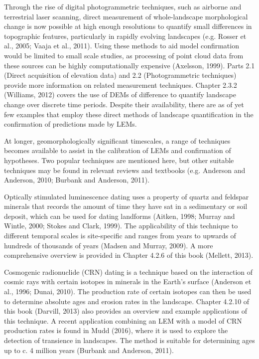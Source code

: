 Through the rise of digital photogrammetric techniques, such as airborne and terrestrial laser scanning, direct measurement of whole-landscape morphological change is now possible at high enough resolutions to quantify small differences in topographic features, particularly in rapidly evolving landscapes (e.g. Rosser et al., 2005; Vaaja et al., 2011). Using these methods to aid model confirmation would be limited to small scale studies, as processing of point cloud data from these sources can be highly computationally expensive (Axelsson, 1999). Parts 2.1 (Direct acquisition of elevation data) and 2.2 (Photogrammetric techniques) provide more information on related measurement techniques. Chapter 2.3.2 (Williams, 2012) covers the use of DEMs of difference to quantify landscape change over discrete time periods. Despite their availability, there are as of yet few examples that employ these direct methods of landscape quantification in the confirmation of predictions made by LEMs.

At longer, geomorphologically significant timescales, a range of techniques becomes available to assist in the calibration of LEMs and confirmation of hypotheses. Two popular techniques are mentioned here, but other suitable techniques may be found in relevant reviews and textbooks (e.g. Anderson and Anderson, 2010; Burbank and Anderson, 2011). 

Optically stimulated luminescence dating uses a property of quartz and feldspar minerals that records the amount of time they have sat in a sedimentary or soil deposit, which can be used for dating landforms (Aitken, 1998; Murray and Wintle, 2000; Stokes and Clark, 1999). The applicability of this technique to different temporal scales is site-specific and ranges from years to upwards of hundreds of thousands of years (Madsen and Murray, 2009). A more comprehensive overview is provided in Chapter 4.2.6 of this book (Mellett, 2013).

Cosmogenic radionuclide (CRN) dating is a technique based on the interaction of cosmic rays with certain isotopes in minerals in the Earth’s surface (Anderson et al., 1996; Dunai, 2010). The production rate of certain isotopes can then be used to determine absolute ages and erosion rates in the landscape. Chapter 4.2.10 of this book (Darvill, 2013) also provides an overview and example applications of this technique. A recent application combining an LEM with a model of CRN production rates is found in Mudd (2016), where it is used to explore the detection of transience in landscapes. The method is suitable for determining ages up to c. 4 million years (Burbank and Anderson, 2011).

